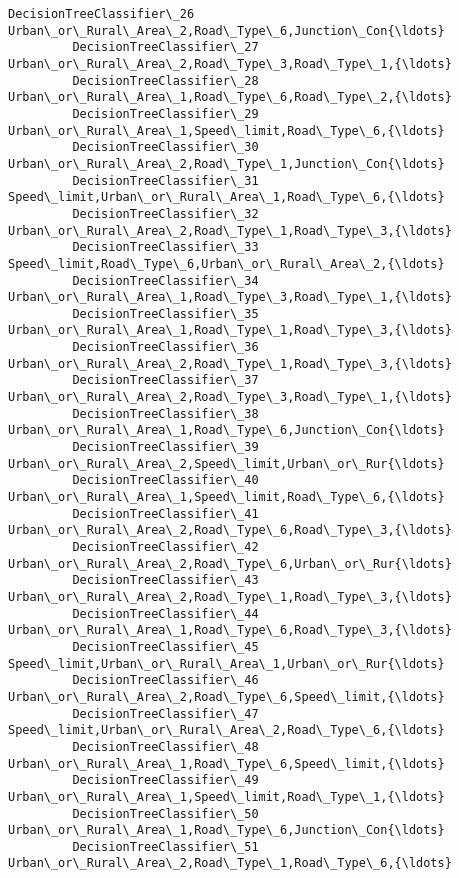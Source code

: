 \documentclass[11pt]{article}
\begin{document}
\begin{Verbatim}[commandchars=\\\{\}]
         DecisionTreeClassifier\_26   Urban\_or\_Rural\_Area\_2,Road\_Type\_6,Junction\_Con{\ldots}   
         DecisionTreeClassifier\_27   Urban\_or\_Rural\_Area\_2,Road\_Type\_3,Road\_Type\_1,{\ldots}   
         DecisionTreeClassifier\_28   Urban\_or\_Rural\_Area\_1,Road\_Type\_6,Road\_Type\_2,{\ldots}   
         DecisionTreeClassifier\_29   Urban\_or\_Rural\_Area\_1,Speed\_limit,Road\_Type\_6,{\ldots}   
         DecisionTreeClassifier\_30   Urban\_or\_Rural\_Area\_2,Road\_Type\_1,Junction\_Con{\ldots}   
         DecisionTreeClassifier\_31   Speed\_limit,Urban\_or\_Rural\_Area\_1,Road\_Type\_6,{\ldots}   
         DecisionTreeClassifier\_32   Urban\_or\_Rural\_Area\_2,Road\_Type\_1,Road\_Type\_3,{\ldots}   
         DecisionTreeClassifier\_33   Speed\_limit,Road\_Type\_6,Urban\_or\_Rural\_Area\_2,{\ldots}   
         DecisionTreeClassifier\_34   Urban\_or\_Rural\_Area\_1,Road\_Type\_3,Road\_Type\_1,{\ldots}   
         DecisionTreeClassifier\_35   Urban\_or\_Rural\_Area\_1,Road\_Type\_1,Road\_Type\_3,{\ldots}   
         DecisionTreeClassifier\_36   Urban\_or\_Rural\_Area\_2,Road\_Type\_1,Road\_Type\_3,{\ldots}   
         DecisionTreeClassifier\_37   Urban\_or\_Rural\_Area\_2,Road\_Type\_3,Road\_Type\_1,{\ldots}   
         DecisionTreeClassifier\_38   Urban\_or\_Rural\_Area\_1,Road\_Type\_6,Junction\_Con{\ldots}   
         DecisionTreeClassifier\_39   Urban\_or\_Rural\_Area\_2,Speed\_limit,Urban\_or\_Rur{\ldots}   
         DecisionTreeClassifier\_40   Urban\_or\_Rural\_Area\_1,Speed\_limit,Road\_Type\_6,{\ldots}   
         DecisionTreeClassifier\_41   Urban\_or\_Rural\_Area\_2,Road\_Type\_6,Road\_Type\_3,{\ldots}   
         DecisionTreeClassifier\_42   Urban\_or\_Rural\_Area\_2,Road\_Type\_6,Urban\_or\_Rur{\ldots}   
         DecisionTreeClassifier\_43   Urban\_or\_Rural\_Area\_2,Road\_Type\_1,Road\_Type\_3,{\ldots}   
         DecisionTreeClassifier\_44   Urban\_or\_Rural\_Area\_1,Road\_Type\_6,Road\_Type\_3,{\ldots}   
         DecisionTreeClassifier\_45   Speed\_limit,Urban\_or\_Rural\_Area\_1,Urban\_or\_Rur{\ldots}   
         DecisionTreeClassifier\_46   Urban\_or\_Rural\_Area\_2,Road\_Type\_6,Speed\_limit,{\ldots}   
         DecisionTreeClassifier\_47   Speed\_limit,Urban\_or\_Rural\_Area\_2,Road\_Type\_6,{\ldots}   
         DecisionTreeClassifier\_48   Urban\_or\_Rural\_Area\_1,Road\_Type\_6,Speed\_limit,{\ldots}   
         DecisionTreeClassifier\_49   Urban\_or\_Rural\_Area\_1,Speed\_limit,Road\_Type\_1,{\ldots}   
         DecisionTreeClassifier\_50   Urban\_or\_Rural\_Area\_1,Road\_Type\_6,Junction\_Con{\ldots}   
         DecisionTreeClassifier\_51   Urban\_or\_Rural\_Area\_2,Road\_Type\_1,Road\_Type\_6,{\ldots}   

\end{Verbatim}
\end{document}
